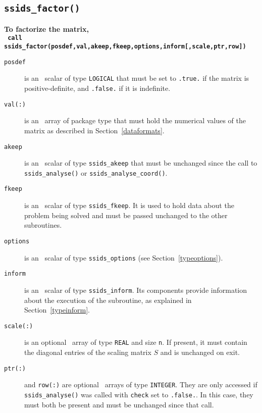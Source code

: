 \documentclass{spral}
\begin{document}
\subsection{\texttt{ssids\_factor()}} \label{factorize}
\textbf{To factorize the matrix,
   \vspace*{0.1cm} \\
   \texttt{ \hspace*{0.2cm}
      call ssids\_factor(posdef,val,akeep,fkeep,options,inform[,scale,ptr,row])
   }
}

\begin{description}
\item[\texttt{posdef}] is an \intentin\ scalar of type {\tt LOGICAL} that
must be set to {\tt .true.} if the matrix is positive-definite, and
{\tt .false.} if it is indefinite.

\item[\texttt{val(:)}] is an \intentin\ array of package type that must hold
the numerical values of the matrix as described in Section~\ref{dataformats}.

\item[\texttt{akeep}]  is an \intentin\ scalar of type
{\tt ssids\_akeep} that must be unchanged since the
call to {\tt ssids\_analyse()} or {\tt ssids\_analyse\_coord()}.

\item[\texttt{fkeep}]  is an \intentinout\ scalar of type
{\tt ssids\_fkeep}. It is used to hold data about the problem being
solved and must be passed unchanged to the other subroutines.

\item[\texttt{options}] is an \intentin\ scalar of type {\tt ssids\_options}
(see Section~\ref{typeoptions}).

\item[\texttt{inform}] is an \intentout\ scalar of type
{\tt ssids\_inform}. Its components provide information about the execution
of the subroutine, as explained in Section~\ref{typeinform}.

\item[\texttt{scale(:)}] is an optional \intentinout\ array of type {\tt REAL}
and size {\tt n}. If present, it must contain  the diagonal
entries of the scaling matrix ${S}$ and is unchanged on exit.

\item[\texttt{ptr(:)}] and {\tt row(:)} are optional \intentin\ arrays of
type {\tt INTEGER}. They are only accessed if {\tt ssids\_analyse()} was called
with {\tt check} set to {\tt .false.}.
In this case, they must both be present and  must be unchanged since that call.

\end{description}
\end{document}
